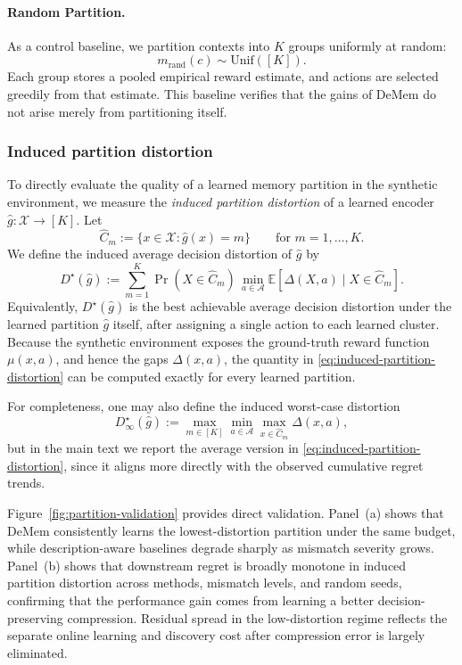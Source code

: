\documentclass{article}
\theoremstyle{plain}
\theoremstyle{definition}
\theoremstyle{remark}
\newcommand{\cA}{\mathcal{A}}
\newcommand{\cX}{\mathcal{X}}
\newcommand{\EE}{\mathbb{E}}
\begin{document}
\paragraph{Random Partition.}
As a control baseline, we partition contexts into \(K\) groups uniformly at random:
\[
m_{\mathrm{rand}}(c) \sim \mathrm{Unif}([K]).
\]
Each group stores a pooled empirical reward estimate, and actions are selected greedily from that estimate. 
This baseline verifies that the gains of DeMem do not arise merely from partitioning itself.

\subsubsection{Induced partition distortion}
\label{app:partition-distortion}

To directly evaluate the quality of a learned memory partition in the synthetic environment, we measure the \emph{induced partition distortion} of a learned encoder $\hat g:\cX\to[K]$.
Let
\[
\hat C_m := \{x\in\cX : \hat g(x)=m\}
\qquad\text{for }m=1,\dots,K.
\]
We define the induced average decision distortion of $\hat g$ by
\begin{equation}
\label{eq:induced-partition-distortion}
D^\star(\hat g)
:=
\sum_{m=1}^K
\Pr(X\in \hat C_m)\,
\min_{a\in\cA}
\EE\!\left[\Delta(X,a)\mid X\in \hat C_m\right].
\end{equation}
Equivalently, $D^\star(\hat g)$ is the best achievable average decision distortion under the learned partition $\hat g$ itself, after assigning a single action to each learned cluster.
Because the synthetic environment exposes the ground-truth reward function $\mu(x,a)$, and hence the gaps $\Delta(x,a)$, the quantity in \eqref{eq:induced-partition-distortion} can be computed exactly for every learned partition.

For completeness, one may also define the induced worst-case distortion
\begin{equation}
\label{eq:induced-partition-distortion-worst}
D^\star_\infty(\hat g)
:=
\max_{m\in[K]}
\min_{a\in\cA}
\max_{x\in \hat C_m}
\Delta(x,a),
\end{equation}
but in the main text we report the average version in \eqref{eq:induced-partition-distortion}, since it aligns more directly with the observed cumulative regret trends.


Figure~\ref{fig:partition-validation} provides direct validation.
Panel~(a) shows that DeMem consistently learns the lowest-distortion partition under the same budget, while description-aware baselines degrade sharply as mismatch severity grows.
Panel~(b) shows that downstream regret is broadly monotone in induced partition distortion across methods, mismatch levels, and random seeds, confirming that the performance gain comes from learning a better decision-preserving compression.
Residual spread in the low-distortion regime reflects the separate online learning and discovery cost after compression error is largely eliminated.
\end{document}
